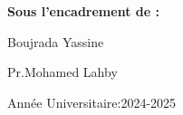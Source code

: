 \documentclass[a4paper,12pt]{report}
\begin{document}
\begin{titlepage}
\begin{sffamily}
\begin{center}
\begin{minipage}{0.5\textwidth}
\begin{flushleft}
      \end{flushleft}
    \end{minipage}
     \begin{minipage}{0.4\textwidth}
      \begin{flushright} \large
      \vspace{16mm}
       \textbf{Sous l’encadrement de :}
      \end{flushright}
     \end{minipage}
     
    \begin{minipage}{0.5\textwidth}
      \begin{flushleft} \large
       \vspace{3mm}
       \texttt{}{Boujrada Yassine}
      \end{flushleft}
    \end{minipage}
    \begin{minipage}{0.3\textwidth}
      \begin{flushright} \large
       \vspace{3mm}
       \texttt{}{Pr.Mohamed Lahby}
      \end{flushright}
    \end{minipage}

     \vfill
     

     {\large Année Universitaire:2024-2025}
     
    \end{center}
   \end{sffamily}
  \end{titlepage}
  \vfill 

\end{document}
